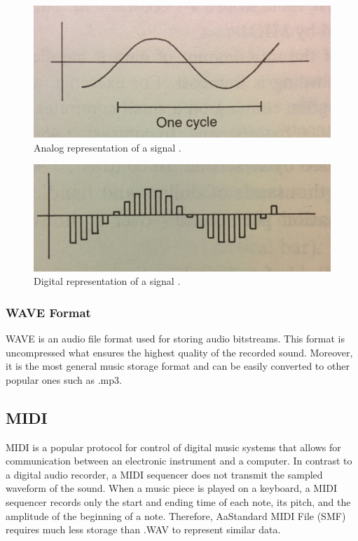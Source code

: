 \documentclass[11pt]{article} %
\begin{document}
\begin{figure}[h!]
\begin{center}
\includegraphics[scale=0.1]{analog}
\end{center}
\caption{Analog representation of a signal \citep*{Roads1996}.}
\label{fig:analog}
\end{figure}

\begin{figure}[h!]
\begin{center}
\includegraphics[scale=0.1]{digital}
\end{center}
\caption{Digital representation of a signal \citep*{Roads1996}.}
\label{fig:digital}
\end{figure}

\subsubsection{WAVE Format}
WAVE is an audio file format used for storing audio bitstreams. This format is uncompressed what ensures the highest quality of the recorded sound. Moreover, it is the most general music storage format and can be easily converted to other popular ones such as .mp3. 

\subsection{MIDI}
MIDI is a popular protocol for control of digital music systems that allows for communication between an electronic instrument and a computer. In contrast to a digital audio recorder, a MIDI sequencer does not transmit the sampled waveform of the sound. When a music piece is played on a keyboard, a MIDI sequencer records only the start and ending time of each note, its pitch, and the amplitude of the beginning of a note. Therefore, AaStandard MIDI File (SMF) requires much less storage than .WAV to represent similar data.
\end{document}
